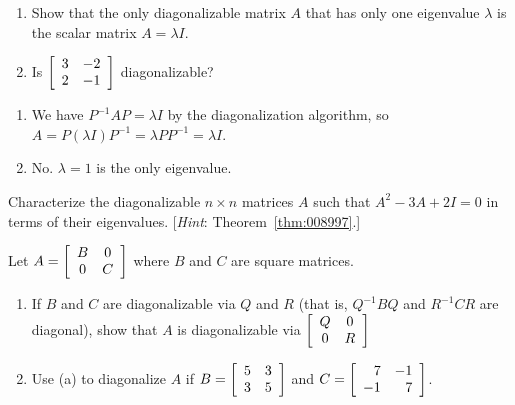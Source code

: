 \begin{multicols}{2}
\begin{ex}
\begin{enumerate}[label={\alph*.}]
\item Show that the only diagonalizable matrix $A$ that has only one eigenvalue $\lambda$ is the scalar matrix $A = \lambda I$.

\item Is $\left[ \begin{array}{rr}
3 & -2 \\
2 & -1 
\end{array}\right]$
 diagonalizable?

\end{enumerate}
\begin{sol}
\begin{enumerate}[label={\alph*.}]
\item  We have $P^{-1}AP = \lambda I$ by the diagonalization algorithm, so $A = P(\lambda I)P^{-1} = \lambda PP^{-1} = \lambda I$.

\item  No. $\lambda = 1$ is the only eigenvalue.

\end{enumerate}
\end{sol}
\end{ex}

\begin{ex}
Characterize the diagonalizable $n \times n$ matrices $A$ such that $A^{2} - 3A + 2I = 0$ in terms of their eigenvalues. [\textit{Hint}: Theorem~\ref{thm:008997}.]
\end{ex}

\begin{ex}
Let $A = \left[ \begin{array}{cc}
B & 0 \\
0 & C 
\end{array}\right]$
 where $B$ and $C$ are square matrices.


\begin{enumerate}[label={\alph*.}]
\item If $B$ and $C$ are diagonalizable via $Q$ and $R$ (that is, $Q^{-1}BQ$ and $R^{-1}CR$ are diagonal), show that $A$ is diagonalizable via $\left[ \begin{array}{cc}
Q & 0 \\
0 & R 
\end{array}\right]$


\item Use (a) to diagonalize $A$ if $B = \left[ \begin{array}{rr}
5 & 3 \\
3 & 5 
\end{array}\right]$
 and $C = \left[ \begin{array}{rr}
7 & -1 \\
-1 & 7 
\end{array}\right]$.



\end{enumerate}
\end{ex}
\end{multicols}
